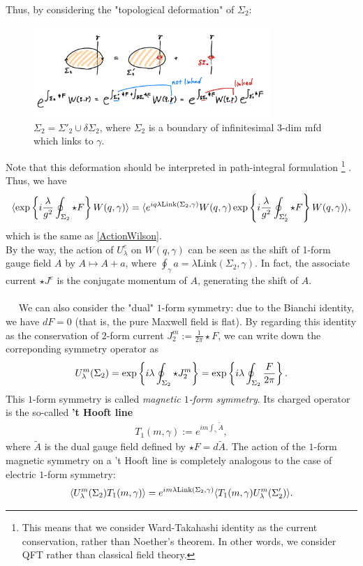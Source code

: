 \documentclass{ltjsarticle}
\theoremstyle{mystyle} %
\numberwithin{equation}{section}
\begin{document}
Thus, by considering the "topological deformation" of $\Sigma_2$: 
\begin{figure}[H]
    \centering
    \includegraphics[width=0.8\textwidth]{ActionToWilsonLine.jpg}
    \caption{$\Sigma_2=\Sigma'_2\cup \delta \Sigma_2$, where $\Sigma_2$ is a boundary of infinitesimal $3$-dim mfd which links to $\gamma$. }
    \label{ActionToWlison}
\end{figure}
\noindent
Note that this deformation should be interpreted in path-integral formulation
\footnote{This means that we consider Ward-Takahashi identity as the current conservation, rather than Noether's theorem. 
In other words, we consider QFT rather than classical field theory. }
. Thus, we have 
\begin{align}
    \langle{\exp\left\{{i\frac{\lambda}{g^2}\oint_{\Sigma_2}\star F}\right\}W(q, \gamma)}\rangle
    =\langle{e^{iq\lambda\mathrm{Link}(\Sigma_2, \gamma)}
    W(q, \gamma)\exp\left\{{i\frac{\lambda}{g^2}\oint_{\Sigma'_2}\star F}\right\}W(q, \gamma)}\rangle, 
\label{WlisonLineCharge}
\end{align}
which is the same as \eqref{ActionWilson}. \\
 By the way, the action of $U^e_\lambda$ on $W(q, \gamma)$ can be seen as the shift of 1-form gauge field $A$ by 
 $A\mapsto A + a$, where $\oint_{\gamma} a =\lambda \mathrm{Link}(\Sigma_2, \gamma)$. 
 In fact, the associate current $\star J^e$ is the conjugate momentum of $A$, generating the shift of $A$. \\
 \\
　 We can also consider the "dual" $1$-form symmetry: due to the Bianchi identity, we have $dF=0$ (that is, the pure Maxwell field is flat). 
 By regarding this identity as the conservation of $2$-form current $J^{m}_2 :=\frac{1}{2\pi}\star F$, we can write down the correponding symmetry operator as
 \begin{align}
    U^{m}_\lambda(\Sigma_2) = \exp\left\{{i\lambda\oint_{\Sigma_2}\star J^m_2}\right\}
    =\exp\left\{{i\lambda\oint_{\Sigma_2}\frac{F}{2\pi}}\right\}. 
 \label{magnetic1form}
 \end{align}
 This $1$-form symmetry is called \textit{magnetic $1$-form symmetry}. Its charged operator is the so-called \textbf{'t Hooft line}
 \begin{align}
    T_1(m, \gamma) := e^{im\int_{\gamma}\tilde{A}}, 
 \label{tHooft}
 \end{align}
 where $\tilde{A}$ is the dual gauge field defined by $\star F=d\tilde{A}$. 
 The action of the $1$-form magnetic symmetry on a 't Hooft line is completely analogous to the case of electric $1$-form symmetry: 
 \begin{align}
    \langle{U^{m}_\lambda(\Sigma_2)T_1(m, \gamma)}\rangle
    =e^{im\lambda\mathrm{Link}(\Sigma_2, \gamma)}\langle{T_1(m, \gamma)U^{m}_\lambda (\Sigma'_2)}\rangle. 
 \label{ActionTotHooft}
 \end{align}
\end{document}
